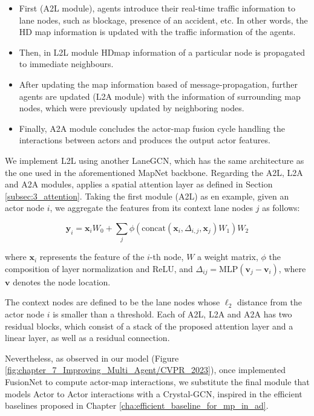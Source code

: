 \begin{itemize}
	
	\item First (A2L module), agents introduce their real-time traffic information to lane nodes, such as blockage, presence of an accident, etc. In other words, the HD map information is updated with the traffic information of the agents.
	
	\item Then, in L2L module \ac{HDmap} information of a particular node is propagated to immediate neighbours.
	
	\item After updating the map information based of message-propagation, further agents are updated (L2A module) with the information of surrounding map nodes, which were previously updated by neighboring nodes.
	
	\item Finally, A2A module concludes the actor-map fusion cycle handling the interactions between actors and produces the output actor features.
	
\end{itemize}

We implement L2L using another LaneGCN, which has the same architecture as the one used in the aforementioned MapNet backbone. Regarding the A2L, L2A and A2A modules, \cite{liang2020learning} applies a spatial attention layer as defined in Section \ref{subsec:3_attention}. Taking the first module (A2L) as en example, given an actor node $i$, we aggregate the features from its context lane nodes $j$ as follows:

\begin{equation}
	\mathbf{y}_i = \mathbf{x}_i W_0 + \sum_j \phi ( \text{concat} (\mathbf{x}_i, \Delta_{i,j}, \mathbf{x}_j) W_1) W_2
	\label{equ:attention}
\end{equation}

where $\mathbf{x}_i$ represents the feature of the $i$-th node, $W$ a weight matrix, $\phi$ the composition of layer normalization and ReLU, and $\Delta_{ij} = \text{MLP}(\mathbf{v}_j - \mathbf{v}_i)$, where $\mathbf{v}$ denotes the node location.

The context nodes are defined to be the lane nodes whose $\ell_2$ distance from the actor node $i$ is smaller than a threshold. Each of A2L, L2A and A2A has two residual blocks, which consist of a stack of the proposed attention layer and a linear layer, as well as a residual connection. 

Nevertheless, as observed in our model (Figure \ref{fig:chapter_7_Improving_Multi_Agent/CVPR_2023}), once implemented FusionNet to compute actor-map interactions, we substitute the final module that models Actor to Actor interactions with a Crystal-\ac{GCN}, inspired in the efficient baselines proposed in Chapter \ref{cha:efficient_baseline_for_mp_in_ad}. %

